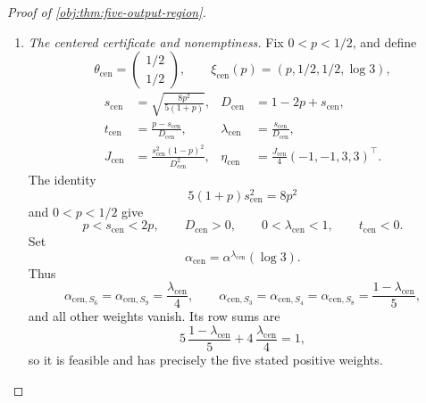 \documentclass[11pt]{article}
\begin{document}
\begin{proof}[Proof of \cref{obj:thm:five-output-region}]
\begin{enumerate}
All pattern masses stay positive nearby. Hence the finitely many
information functions, projected scores, and dual-ray values are
continuous at \(\xi_\circ\). The strict inactive slacks and nonzero score
differences therefore persist simultaneously:
\[
\begin{gathered}
f_S(\xi,t_\sigma(\xi))
<
b_S(\varepsilon)^\top\eta(\xi)
\quad(S\notin\mathcal K_5),\\
\rho_S(\xi,t_\sigma(\xi))
\ne\rho_T(\xi,t_\sigma(\xi))
\quad(S,T\in\mathcal K_5,\ S\ne T).
\end{gathered}
\]
The strict interior inequalities, the branch denominator, and the
derivative difference likewise persist. For every point in the resulting
neighborhood, choose
\[
\alpha(\xi)=\alpha^{u_\sigma(\xi)}(\varepsilon).
\]
The normalization calculation gives feasibility and five positive
weights, while the defining formula for \(u_\sigma\) gives
\[
\partial_tF_{\theta(\xi)}
\bigl(\alpha(\xi),t_\sigma(\xi)\bigr)=0.
\]
Together with the continued dual equalities, strict slacks, and score
separation, these are all the certificate conditions. Every point of
\(\mathcal R_5\) consequently has a neighborhood in \(\mathbb R^4\)
contained in \(\mathcal R_5\), proving openness.

\item \textit{The centered certificate and nonemptiness.}
Fix \(0<p<1/2\), and define
\[
\theta_{\mathrm{cen}}=\begin{pmatrix}1/2\\1/2\end{pmatrix},
\qquad
\xi_{\mathrm{cen}}(p)=(p,1/2,1/2,\log3),
\]
\[
\begin{aligned}
s_{\mathrm{cen}}&=\sqrt{\frac{8p^2}{5(1+p)}},
&
D_{\mathrm{cen}}&=1-2p+s_{\mathrm{cen}},\\
t_{\mathrm{cen}}&=\frac{p-s_{\mathrm{cen}}}{D_{\mathrm{cen}}},
&
\lambda_{\mathrm{cen}}&=\frac{s_{\mathrm{cen}}}{D_{\mathrm{cen}}},\\
J_{\mathrm{cen}}&=\frac{s_{\mathrm{cen}}^2(1-p)^2}{D_{\mathrm{cen}}^2},
&
\eta_{\mathrm{cen}}&=\frac{J_{\mathrm{cen}}}{4}(-1,-1,3,3)^\top.
\end{aligned}
\]
The identity
\[
5(1+p)s_{\mathrm{cen}}^2=8p^2
\]
and \(0<p<1/2\) give
\[
p<s_{\mathrm{cen}}<2p,\qquad
D_{\mathrm{cen}}>0,\qquad
0<\lambda_{\mathrm{cen}}<1,\qquad
t_{\mathrm{cen}}<0.
\]
Set
\[
\alpha_{\mathrm{cen}}=\alpha^{\lambda_{\mathrm{cen}}}(\log3).
\]
Thus
\[
\alpha_{\mathrm{cen},S_6}
=\alpha_{\mathrm{cen},S_9}=\frac{\lambda_{\mathrm{cen}}}{4},
\qquad
\alpha_{\mathrm{cen},S_3}
=\alpha_{\mathrm{cen},S_4}
=\alpha_{\mathrm{cen},S_8}
=\frac{1-\lambda_{\mathrm{cen}}}{5},
\]
and all other weights vanish. Its row sums are
\[
5\,\frac{1-\lambda_{\mathrm{cen}}}{5}
+
4\,\frac{\lambda_{\mathrm{cen}}}{4}=1,
\]
so it is feasible and has precisely the five stated positive weights.


\end{enumerate}
\end{proof}
\end{document}
